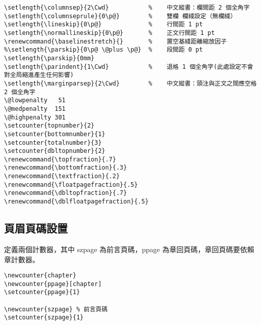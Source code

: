 \begin{lstlisting}[firstnumber=386]
\setlength{\columnsep}{2\Cwd}           %    中文縱書：欄間距 2 個全角字
\setlength{\columnseprule}{0\p@}        %    雙欄 欄綫設定（無欄綫）
\setlength{\lineskip}{0\p@}             %    行間距 1 pt
\setlength{\normallineskip}{0\p@}       %    正文行間距 1 pt
\renewcommand{\baselinestretch}{}       %    置空基綫距離縮放因子
%\setlength{\parskip}{0\p@ \@plus \p@}  %    段間距 0 pt
\setlength{\parskip}{0mm}
\setlength{\parindent}{1\Cwd}           %    退格 1 個全角字(此處設定不會對全局縮進產生任何影響)
\setlength{\marginparsep}{2\Cwd}        %    中文縱書：頭注與正文之間應空格 2 個全角字
\@lowpenalty   51
\@medpenalty  151
\@highpenalty 301
\setcounter{topnumber}{2}
\setcounter{bottomnumber}{1}
\setcounter{totalnumber}{3}
\setcounter{dbltopnumber}{2}
\renewcommand{\topfraction}{.7}
\renewcommand{\bottomfraction}{.3}
\renewcommand{\textfraction}{.2}
\renewcommand{\floatpagefraction}{.5}
\renewcommand{\dbltopfraction}{.7}
\renewcommand{\dblfloatpagefraction}{.5}
\end{lstlisting}

\subsection{頁眉頁碼設置 }

\par%
定義兩個計數器，其中 szpage 為前言頁碼，ppage 為章回頁碼，章回頁碼要依賴章計數器。
\begin{lstlisting}[firstnumber=410]
\newcounter{chapter}
\newcounter{ppage}[chapter]
\setcounter{ppage}{1}

\newcounter{szpage} % 前言頁碼
\setcounter{szpage}{1}
\end{lstlisting}


